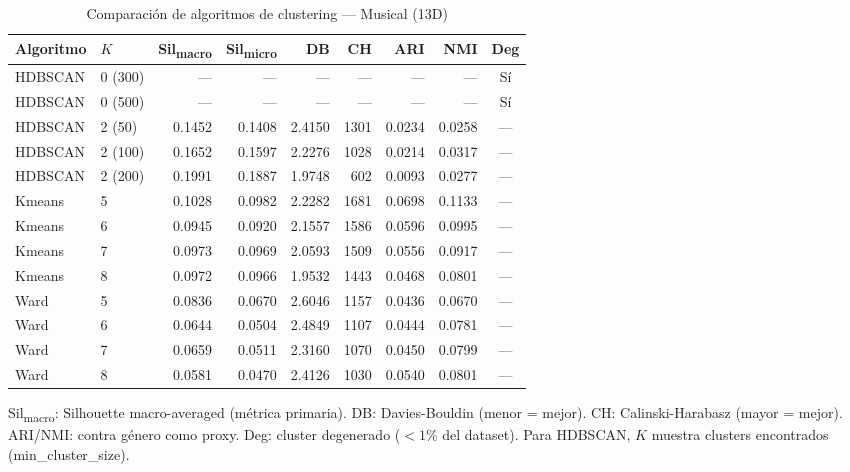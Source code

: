\begin{table}[htbp]
  \centering
  \small
  \caption{Comparación de algoritmos de clustering --- Musical (13D)}
  \label{tab:clustering_comparison_musical_13d}
  \begin{tabular}{llrrrrrrc}
    \toprule
    Algoritmo & $K$ & Sil\textsubscript{macro} & Sil\textsubscript{micro} & DB & CH & ARI & NMI & Deg \\
    \midrule
    HDBSCAN & 0 (300) & --- & --- & --- & --- & --- & --- & Sí \\
    HDBSCAN & 0 (500) & --- & --- & --- & --- & --- & --- & Sí \\
    HDBSCAN & 2 (50) & 0.1452 & 0.1408 & 2.4150 & 1301 & 0.0234 & 0.0258 & --- \\
    HDBSCAN & 2 (100) & 0.1652 & 0.1597 & 2.2276 & 1028 & 0.0214 & 0.0317 & --- \\
    HDBSCAN & 2 (200) & 0.1991 & 0.1887 & 1.9748 & 602 & 0.0093 & 0.0277 & --- \\
    Kmeans & 5 & 0.1028 & 0.0982 & 2.2282 & 1681 & 0.0698 & 0.1133 & --- \\
    Kmeans & 6 & 0.0945 & 0.0920 & 2.1557 & 1586 & 0.0596 & 0.0995 & --- \\
    Kmeans & 7 & 0.0973 & 0.0969 & 2.0593 & 1509 & 0.0556 & 0.0917 & --- \\
    Kmeans & 8 & 0.0972 & 0.0966 & 1.9532 & 1443 & 0.0468 & 0.0801 & --- \\
    Ward & 5 & 0.0836 & 0.0670 & 2.6046 & 1157 & 0.0436 & 0.0670 & --- \\
    Ward & 6 & 0.0644 & 0.0504 & 2.4849 & 1107 & 0.0444 & 0.0781 & --- \\
    Ward & 7 & 0.0659 & 0.0511 & 2.3160 & 1070 & 0.0450 & 0.0799 & --- \\
    Ward & 8 & 0.0581 & 0.0470 & 2.4126 & 1030 & 0.0540 & 0.0801 & --- \\
    \bottomrule
  \end{tabular}
  \begin{tablenotes}[flushleft]
    \small
    \item Sil\textsubscript{macro}: Silhouette macro-averaged (métrica primaria). DB: Davies-Bouldin (menor = mejor). CH: Calinski-Harabasz (mayor = mejor). ARI/NMI: contra género como proxy. Deg: cluster degenerado ($<1\%$ del dataset). Para HDBSCAN, $K$ muestra clusters encontrados (min\_cluster\_size).
  \end{tablenotes}
\end{table}